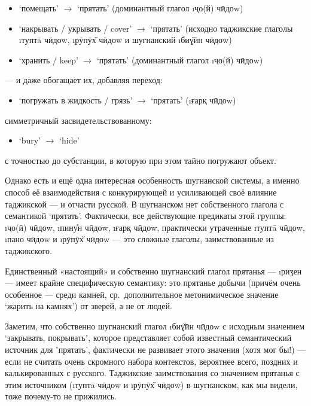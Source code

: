 \begin{itemize}
 \item ‘помещать’ $\rightarrow$ ‘прятать’ (доминантный глагол \i{ҷо(й) чӣдоw})
 \item ‘накрывать / укрывать / cover’ $\rightarrow$ ‘прятать’ (исходно таджикские глаголы \i{туптā чӣдоw}, \i{рӯпӯх̌ чӣдоw} и шугнанский \i{биɣ̌ӣн чӣдоw})
 \item ‘хранить / keep’ $\rightarrow$ ‘прятать’ (доминантный глагол \i{ҷо(й) чӣдоw})
\end{itemize}

— и даже обогащает их, добавляя переход:

\begin{itemize}
 \item ‘погружать в жидкость / грязь’ $\rightarrow$ ‘прятать’ (\i{ғарқ чӣдоw})
\end{itemize}

симметричный засвидетельствованному:

\begin{itemize}
 \item ‘bury’ $\rightarrow$ ‘hide’
\end{itemize}

с точностью до субстанции, в которую при этом тайно погружают объект.

Однако есть и ещё одна интересная особенность шугнанской системы, а именно способ её взаимодействия с конкурирующей и усиливающей своё влияние таджикской — и отчасти русской. В шугнанском нет собственного глагола с семантикой ‘прятать’. Фактически, все действующие предикаты этой группы: \i{ҷо(й) чӣдоw}, \i{пину̊н чӣдоw}, \i{ғарқ чӣдоw}, практически утраченные \i{туптā чӣдоw}, \i{пано чӣдоw} и \i{рӯпӯх̌ чӣдоw} — это сложные глаголы, заимствованные из таджикского.

Единственный «настоящий» и собственно шугнанский глагол прятанья — \i{риӡен} — имеет крайне специфическую семантику: это прятанье добычи (причём очень особенное — среди камней, ср.~дополнительное метонимическое значение ‘жарить на камнях’) от зверей, а не от людей.

Заметим, что собственно шугнанский глагол \i{биɣ̌ӣн чӣдоw} с исходным значением ‘закрывать, покрыватьʼ, которое представляет собой известный семантический источник для ʽпрятать’, фактически не развивает этого значения (хотя мог бы!) — если не считать очень скромного набора контекстов, вероятнее всего, поздних и калькированных с русского. Таджикские заимствования со значением прятанья с этим источником (\i{туптā чӣдоw} и \i{рӯпӯх̌ чӣдоw}) в шугнанском, как мы видели, тоже почему-то не прижились.

